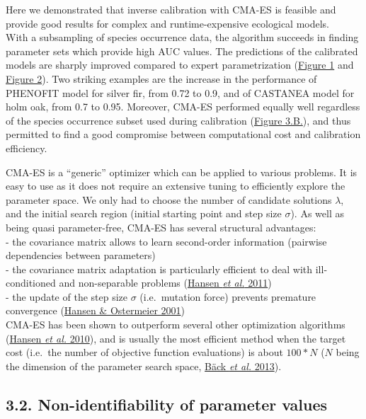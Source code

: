 \documentclass[11pt,]{article}
\begin{document}
Here we demonstrated that inverse calibration with CMA-ES is feasible
and provide good results for complex and runtime-expensive ecological
models.\\
With a subsampling of species occurrence data, the algorithm succeeds in
finding parameter sets which provide high AUC values. The predictions of
the calibrated models are sharply improved compared to expert
parametrization (\hyperref[fig:phenofitmaps]{Figure 1} and
\hyperref[fig:castaneamaps]{Figure 2}). Two striking examples are the
increase in the performance of PHENOFIT model for silver fir, from 0.72
to 0.9, and of CASTANEA model for holm oak, from 0.7 to 0.95. Moreover,
CMA-ES performed equally well regardless of the species occurrence
subset used during calibration
(\hyperref[fig:cmaesrepAUCcal]{Figure 3.B.}), and thus permitted to find
a good compromise between computational cost and calibration efficiency.

CMA-ES is a ``generic'' optimizer which can be applied to various
problems. It is easy to use as it does not require an extensive tuning
to efficiently explore the parameter space. We only had to choose the
number of candidate solutions \(\lambda\), and the initial search region
(initial starting point and step size \(\sigma\)). As well as being
quasi parameter-free, CMA-ES has several structural advantages:\\
- the covariance matrix allows to learn second-order information
(pairwise dependencies between parameters)\\
- the covariance matrix adaptation is particularly efficient to deal
with ill-conditioned and non-separable problems
(\protect\hyperlink{ref-Hansen2011}{Hansen \emph{et al.} 2011})\\
- the update of the step size \(\sigma\) (i.e.~mutation force) prevents
premature convergence (\protect\hyperlink{ref-Hansen2001}{Hansen \&
Ostermeier 2001})\\
CMA-ES has been shown to outperform several other optimization
algorithms (\protect\hyperlink{ref-Hansen2010}{Hansen \emph{et al.}
2010}), and is usually the most efficient method when the target cost
(i.e.~the number of objective function evaluations) is about \(100*N\)
(\(N\) being the dimension of the parameter search space,
\protect\hyperlink{ref-Baeck2013}{Bäck \emph{et al.} 2013}).

\hypertarget{non-identifiability-of-parameter-values}{%
\subsection{3.2. Non-identifiability of parameter
values}\label{non-identifiability-of-parameter-values}}
\end{document}
